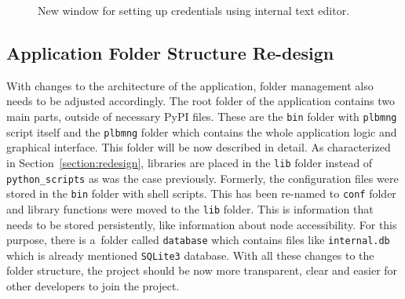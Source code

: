{{{{\begin{figure}[H]
	\centering
	\caption{New window for setting up credentials using internal text editor.}
	\label{fig:credentials}
\end{figure}

\subsection{Application Folder Structure Re-design}
With changes to the architecture of the application, folder management also needs to be adjusted accordingly. The root folder of the application contains two main parts, outside of necessary PyPI files. These are the \texttt{bin} folder with \texttt{plbmng} script itself and the \texttt{plbmng} folder which contains the whole application logic and graphical interface. This folder will be now described in detail. As characterized in Section~\ref{section:redesign}, libraries are placed in the \texttt{lib} folder instead of \texttt{python\_scripts} as was the case previously. Formerly, the configuration files were stored in the \texttt{bin} folder with shell scripts. This has been re-named to \texttt{conf} folder and library functions were moved to the \texttt{lib} folder. This is information that needs to be stored persistently, like information about node accessibility. For this purpose, there is a~folder called \texttt{database} which contains files like \texttt{internal.db} which is already mentioned \texttt{SQLite3} database. With all these changes to the folder structure, the project should be now more transparent, clear and easier for other developers to join the project.

}}}}
